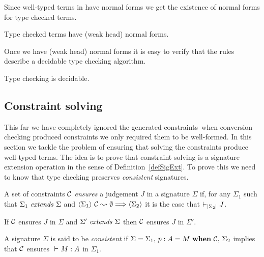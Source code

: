 Since well-typed terms in {\Core} have normal forms we get the existence of
normal forms for type checked terms.

\begin{corollary}
    Type checked terms have (weak head) normal forms.
\end{corollary}

Once we have (weak head) normal forms it is easy to verify that the rules
describe a decidable type checking algorithm.

\begin{corollary}
    Type checking is decidable.
\end{corollary}

\subsection{Constraint solving}

This far we have completely ignored the generated constraints--when conversion
checking produced constraints we only required them to be well-formed. In this
section we tackle the problem of ensuring that solving the constraints produce
well-typed terms. The idea is to prove that constraint solving is a
signature extension operation in the sense of Definition~\ref{defSigExt}. To
prove this we need to know that type checking preserves {\em consistent}
signatures.

\begin{definition}[Ensures] \label{defEnsures}
    A set of constraints $\mathcal{C}$ {\em ensures} a {\Core} judgement $J$ in a signature
    $\Sigma$ if, for any $\Sigma_1$ such that
    ${\Sigma_1} ~ \mathit{extends} ~ {\Sigma}$ and
    $\langle {\Sigma_1} \rangle ~ {{\mathcal{C}} \leadsto {\emptyset}} \Longrightarrow \langle {\Sigma_2} \rangle$
    it is the case that $\vdash_{\left|{\Sigma_2}\right|} J$.
\end{definition}

\begin{lemma} \label{lemExtendEnsures}
    If $\mathcal{C}$ ensures $J$ in $\Sigma$ and ${\Sigma'} ~ \mathit{extends} ~ {\Sigma}$ then $\mathcal{C}$
    ensures $J$ in $\Sigma'$.
\end{lemma}

\begin{definition} \label{defConsistentSig}
    A signature $\Sigma$ is said to be {\em consistent} if $\Sigma = {\Sigma_1},\,{} {{p} : {A} = {M} ~\mathbf{when}~ {\mathcal{C}}},\,{} \Sigma_2$ implies that $\mathcal{C}$ ensures
    ${} \vdash_{} {M} : {A}$ in $\Sigma_1$.
\end{definition}

